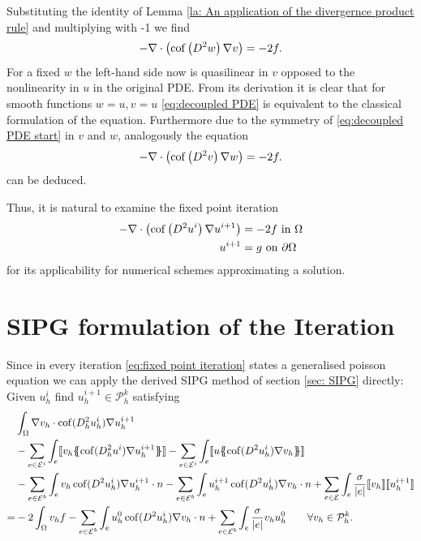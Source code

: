Substituting the identity of Lemma \ref{la: An application of the divergernce product rule} and multiplying with -1 we find
\begin{align}
	- \nabla \cdot \left( \operatorname{cof} \left(  D^2 w \right) \nabla v \right)  = -2f.  \label{eq:decoupled PDE}
\end{align}
For a fixed $w$ the left-hand side now is quasilinear in $v$ opposed to the nonlinearity in $u$ in the original PDE. From its derivation it is clear that for smooth functions $w=u, v=u$ \eqref{eq:decoupled PDE} is equivalent to the classical formulation of the \MA equation. Furthermore due to the symmetry of \eqref{eq:decoupled PDE start} in $v$ and $w$, analogously the equation 
\begin{align}
	- \nabla \cdot \left( \operatorname{cof} \left(  D^2 v \right) \nabla w \right)  = -2f.  \label{eq:decoupled PDE two}
\end{align}
can be deduced.

Thus, it is natural to examine the fixed point iteration
\begin{align}
	\begin{split}
	- \nabla \cdot \left( \operatorname{cof} \left(  D^2 u^i \right) \nabla u^{i+1} \right)  &= -2f  \text{ in } \Omega \\
		u^{i+1} &= g \textnormal{ on } \partial \Omega
	\label{eq:fixed point iteration}
	\end{split}
\end{align}
for its applicability for numerical schemes approximating a \MA solution.

\section{SIPG formulation of the Iteration}\label{sec: SIPG MA}
Since in every iteration \eqref{eq:fixed point iteration} states a generalised poisson equation we can apply the derived  SIPG method of section \ref{sec: SIPG} directly: Given $u^i_h$ find $u^{i+1}_h \in \mathcal P^k_h$ satisfying
\begin{align}
 &\int_{\Omega} \nabla v_h \cdot \cof(D_h^2 u_h^{i}) \nabla u_h^{i+1}  \nonumber\\
 & -\sum\limits_{e \in \bigEps^i}\int_{e} \jump {v_h \average { \cof(D_h^2 u^{i}) \nabla u_h^{i+1}} }
 - \sum\limits_{e \in \bigEps^i}\int_{e} \jump {u \average{ \cof(D^2 u_h^{i}) \nabla v_h} } \nonumber\\  
 & - \sum\limits_{e \in \bigEps^b}\int_{e} v_h \cof(D^2 u_h^{i}) \nabla u_h^{i+1}\cdot n 
    - \sum\limits_{e \in \bigEps^b}\int_{e} u_h^{i+1}\cof(D^2 u_h^{i}) \nabla v_h \cdot n
    +\sum\limits_{e \in \bigEps} \int_e \frac \sigma {|e|} \jump {v_h}  \jump {u_h^{i+1}}\nonumber\\
    =& - 2 \int_{\Omega}v_h f
    	 				-\sum\limits_{e \in \bigEps^b}\int_{e} u_h^0 \cof(D^2 u_h^{i}) \nabla v_h \cdot n 
    	 				+\sum\limits_{e \in \bigEps^b} \int_e \frac \sigma {|e|} v_h u_h^0    \qquad \forall v_h \in  \mathcal P^k_h.
    	\label{eq: sipg iteration}
\end{align}

